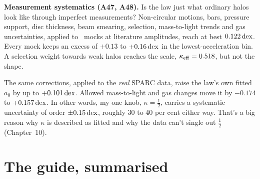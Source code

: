 \textbf{Measurement systematics (A47, A48).} Is the law just what ordinary halos look like through imperfect measurements? Non-circular motions, bars, pressure support, disc thickness, beam smearing, selection, mass-to-light trends and gas uncertainties, applied to \LCDM\ mocks at literature amplitudes, reach at best $0.122\,\mathrm{dex}$. Every mock keeps an excess of $+0.13$ to $+0.16\,\mathrm{dex}$ in the lowest-acceleration bin. A selection weight towards weak halos reaches the scale, $\kappa_{\rm eff}=0.518$, but not the shape.

\begin{honestbox}
The same corrections, applied to the \emph{real} SPARC data, raise the law's own fitted $a_0$ by up to $+0.101\,\mathrm{dex}$. Allowed mass-to-light and gas changes move it by $-0.174$ to $+0.157\,\mathrm{dex}$. In other words, my one knob, $\kappa=\tfrac12$, carries a systematic uncertainty of order $\pm0.15\,\mathrm{dex}$, roughly 30 to 40 per cent either way. That's a big reason why $\kappa$ is described as fitted and why the data can't single out $\tfrac12$ (Chapter~10).
\end{honestbox}




\section{The guide, summarised}



